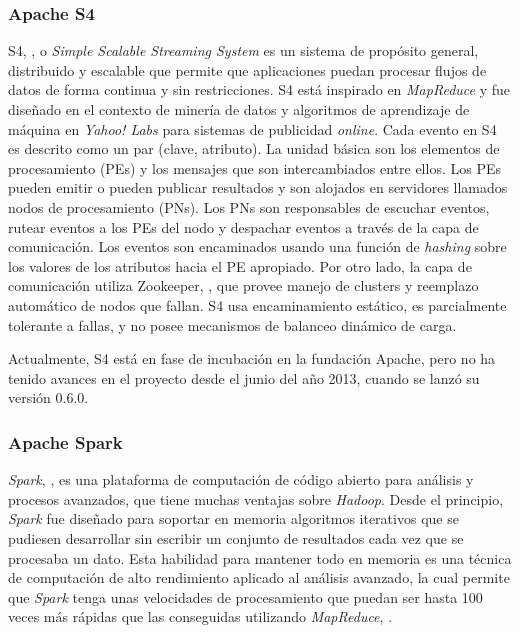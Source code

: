 \subsubsection*{Apache S4}
\label{arte:SPS:s4}
					
S4, \cite{NeumeyerS4}, o \textit{Simple Scalable Streaming System} es un sistema de propósito general, distribuido y escalable que permite que aplicaciones puedan procesar flujos de datos de forma continua y sin restricciones. S4 está inspirado en \textit{MapReduce} y fue diseñado en el contexto de minería de datos y algoritmos de aprendizaje de máquina en \textit{Yahoo! Labs} para sistemas de publicidad \textit{online}. Cada evento en S4 es descrito como un par (clave, atributo). La unidad básica son los elementos de procesamiento (PEs) y los mensajes que son intercambiados entre ellos. Los PEs pueden emitir o pueden publicar resultados y son alojados en servidores llamados nodos de procesamiento (PNs). Los PNs son responsables de escuchar eventos, rutear eventos a los PEs del nodo y despachar eventos a través de la capa de comunicación. Los eventos son encaminados usando una función de \textit{hashing} sobre los valores de los atributos hacia el PE apropiado. Por otro lado, la capa de comunicación utiliza Zookeeper, \cite{HuntZookeeper}, que provee manejo de clusters y reemplazo automático de nodos que fallan. S4 usa encaminamiento estático, es parcialmente tolerante a fallas, y no posee mecanismos de balanceo dinámico de carga.
					
Actualmente, S4 está en fase de incubación en la fundación Apache, pero no ha tenido avances en el proyecto desde el junio del año 2013, cuando se lanzó su versión 0.6.0.

\subsubsection*{Apache Spark}
\label{arte:SPS:spark}

\textit{Spark}, \cite{SparkOnline}, es una plataforma de computación de código abierto para análisis y procesos avanzados, que tiene muchas ventajas sobre \textit{Hadoop}. Desde el principio, \textit{Spark} fue diseñado para soportar en memoria algoritmos iterativos que se pudiesen desarrollar sin escribir un conjunto de resultados cada vez que se procesaba un dato. Esta habilidad para mantener todo en memoria es una técnica de computación de alto rendimiento aplicado al análisis avanzado, la cual permite que \textit{Spark} tenga unas velocidades de procesamiento que puedan ser hasta 100 veces más rápidas que las conseguidas utilizando \textit{MapReduce}, \cite{Spark}.

